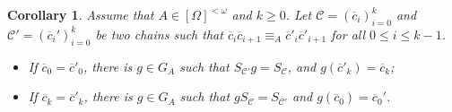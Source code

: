 \documentclass[10pt,a4paper]{amsart}
\newcommand{\nn}[0]{S}
\newcommand{\C}[0]{\mathcal{C}}
\newcommand{\fps}[1]{[#1]^{<\omega}}
\newcommand{\orq}[0]{\equiv}
\renewcommand\leq{\leqslant}
\renewcommand\geq{\geqslant}
\theoremstyle{plain}
\newtheorem{corollary}[theorem]{Corollary}
\theoremstyle{remark}
\begin{document}
  \begin{corollary}
  	\label{change chains} Assume that $A\in\fps{\Omega}$ and $k\geq 0$. {Let $\C=(\overline{c}_{i})_{i=0}^{k}$  and $\C'=(\overline{c}_{i}')_{i=0}^{k}$ be two chains such that $\overline{c}_{i}\overline{c}_{i+1}\orq_{A} \overline{c}'_{i}\overline{c}'_{i+1}$ for all $0\leq i\leq k-1$.}
    \begin{itemize}
     \item {If $\overline{c}_{0}=\overline{c}'_{0}$, there is $g\in G_{A}$ such that $\nn_{\C'}g=\nn_{\C}$, and $g(\overline{c}'_{k})=\overline{c}_k$;}
        \item {If $\overline{c}_{k}=\overline{c}'_{k}$, there is $g\in G_{A}$ such that $g\nn_{\C}=\nn_{\C'}$ and $g(\overline{c}_{0})=\overline{c}_0'$.}
    \end{itemize}
    
  
  \end{corollary}
\end{document}
